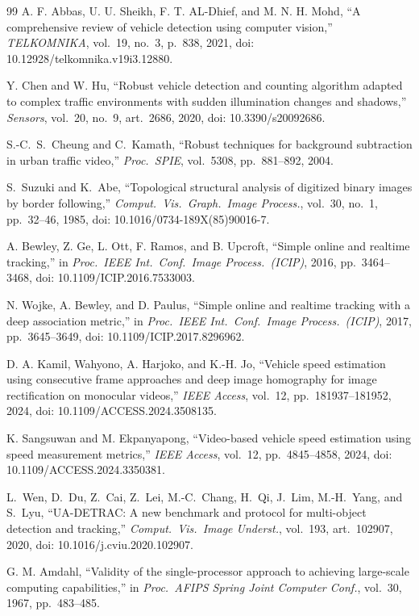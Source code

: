 \documentclass[conference]{IEEEtran}
\begin{document}
\begin{thebibliography}{99}
A. F. Abbas, U. U. Sheikh, F. T. AL-Dhief, and M. N. H. Mohd, ``A
comprehensive review of vehicle detection using computer vision,''
\emph{TELKOMNIKA}, vol.~19, no.~3, p.~838, 2021, doi:
10.12928/telkomnika.v19i3.12880.

Y. Chen and W. Hu, ``Robust vehicle detection and counting algorithm
adapted to complex traffic environments with sudden illumination changes
and shadows,'' \emph{Sensors}, vol.~20, no.~9, art.~2686, 2020, doi:
10.3390/s20092686.

S.-C.\ S.\ Cheung and C.\ Kamath, ``Robust techniques for background
subtraction in urban traffic video,'' \emph{Proc.\ SPIE}, vol.\ 5308,
pp.\ 881--892, 2004.

S.\ Suzuki and K.\ Abe, ``Topological structural analysis of digitized
binary images by border following,'' \emph{Comput.\ Vis.\ Graph.\ Image
Process.}, vol.\ 30, no.\ 1, pp.\ 32--46, 1985, doi:
10.1016/0734-189X(85)90016-7.

A. Bewley, Z. Ge, L. Ott, F. Ramos, and B. Upcroft, ``Simple online and
realtime tracking,'' in \emph{Proc.\ IEEE Int.\ Conf.\ Image Process.\
(ICIP)}, 2016, pp.~3464--3468, doi: 10.1109/ICIP.2016.7533003.

N. Wojke, A. Bewley, and D. Paulus, ``Simple online and realtime
tracking with a deep association metric,'' in \emph{Proc.\ IEEE Int.\
Conf.\ Image Process.\ (ICIP)}, 2017, pp.~3645--3649, doi:
10.1109/ICIP.2017.8296962.

D. A. Kamil, Wahyono, A. Harjoko, and K.-H. Jo, ``Vehicle speed
estimation using consecutive frame approaches and deep image homography
for image rectification on monocular videos,'' \emph{IEEE Access},
vol.~12, pp.~181937--181952, 2024, doi: 10.1109/ACCESS.2024.3508135.

\bibitem{sangsuwan2024}
K. Sangsuwan and M. Ekpanyapong, ``Video-based vehicle speed estimation
using speed measurement metrics,'' \emph{IEEE Access}, vol.~12,
pp.~4845--4858, 2024, doi: 10.1109/ACCESS.2024.3350381.

L.\ Wen, D.\ Du, Z.\ Cai, Z.\ Lei, M.-C.\ Chang, H.\ Qi, J.\ Lim,
M.-H.\ Yang, and S.\ Lyu, ``UA-DETRAC: A new benchmark and protocol for
multi-object detection and tracking,'' \emph{Comput.\ Vis.\ Image
Underst.}, vol.\ 193, art.\ 102907, 2020, doi:
10.1016/j.cviu.2020.102907.

G. M. Amdahl, ``Validity of the single-processor approach to achieving
large-scale computing capabilities,'' in \emph{Proc.\ AFIPS Spring Joint
Computer Conf.}, vol.\ 30, 1967, pp.\ 483--485.


\end{thebibliography}
\end{document}
